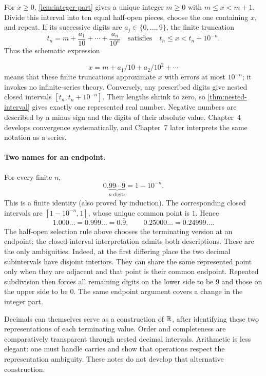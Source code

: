 For $x\geq0$, \cref{lem:integer-part} gives a unique integer $m\geq0$
with $m\leq x<m+1$. Divide this interval into ten equal half-open pieces,
choose the one containing $x$, and repeat. If its successive digits are
$a_j\in\{0,\ldots,9\}$, the finite truncation
\[
t_n=m+\frac{a_1}{10}+\cdots+\frac{a_n}{10^n}
\quad\text{satisfies}\quad t_n\leq x<t_n+10^{-n}.
\]
Thus the schematic expression

\[
x=m+a_1/10+a_2/10^2+\cdots
\]
 means that these finite truncations
approximate $x$ with errors at most $10^{-n}$; it invokes no infinite-series
theory. Conversely, any prescribed digits give nested closed intervals
$[t_n,t_n+10^{-n}]$. Their lengths shrink to zero, so
\cref{thm:nested-interval} gives exactly one represented real number.
Negative numbers are described by a minus sign and the digits of their
absolute value. Chapter~4 develops convergence systematically, and
Chapter~7 later interprets the same notation as a series.

\paragraph{Two names for an endpoint.}
For every finite $n$,
\[
0.\underbrace{99\cdots9}_{n\text{ digits}}=1-10^{-n}.
\]
This is a finite identity (also proved by induction). The corresponding
closed intervals are $[1-10^{-n},1]$, whose unique common point is $1$.
Hence
\[
1.000\ldots=0.999\ldots=0.\overline9,
\qquad 0.25000\ldots=0.24999\ldots.
\]
The half-open selection rule above chooses the terminating version at an
endpoint; the closed-interval interpretation admits both descriptions.
These are the only ambiguities. Indeed, at the first differing place the
two decimal subintervals have disjoint interiors. They can share the same
represented point only when they are adjacent and that point is their
common endpoint. Repeated subdivision then forces all remaining digits
on the lower side to be $9$ and those on the upper side to be $0$.
The same endpoint argument covers a change in the integer part.

Decimals can themselves serve as a construction of $\mathbb{R}$, after identifying
these two representations of each terminating value. Order and
completeness are comparatively transparent through nested decimal
intervals. Arithmetic is less elegant: one must handle carries and show
that operations respect the representation ambiguity. These notes do not
develop that alternative construction.

